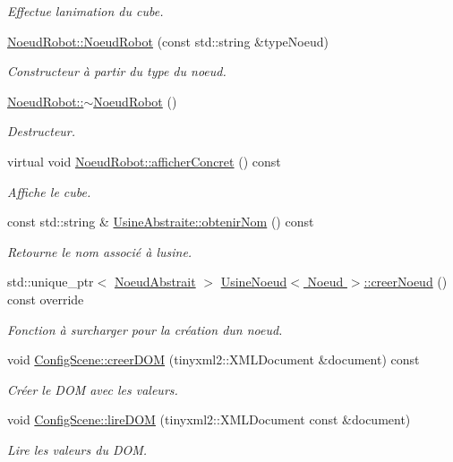\begin{DoxyCompactItemize}
\begin{DoxyCompactList}\small\item\em Effectue l\textquotesingle{}animation du cube. \end{DoxyCompactList}\item 
\hyperlink{group__inf2990_ga147453ac7f72970d7d9bfe336998ad94}{Noeud\+Robot\+::\+Noeud\+Robot} (const std\+::string \&type\+Noeud)
\begin{DoxyCompactList}\small\item\em Constructeur à partir du type du noeud. \end{DoxyCompactList}\item 
\hyperlink{group__inf2990_ga5649710d151f0548d8a7a279aad4c655}{Noeud\+Robot\+::$\sim$\+Noeud\+Robot} ()
\begin{DoxyCompactList}\small\item\em Destructeur. \end{DoxyCompactList}\item 
virtual void \hyperlink{group__inf2990_gad63a8e09cc5ca8cc349f35e0901474e2}{Noeud\+Robot\+::afficher\+Concret} () const 
\begin{DoxyCompactList}\small\item\em Affiche le cube. \end{DoxyCompactList}\item 
\hypertarget{group__inf2990_gad39877ea31a37efc3e58708193155c3c}{}const std\+::string \& \hyperlink{group__inf2990_gad39877ea31a37efc3e58708193155c3c}{Usine\+Abstraite\+::obtenir\+Nom} () const \label{group__inf2990_gad39877ea31a37efc3e58708193155c3c}

\begin{DoxyCompactList}\small\item\em Retourne le nom associé à l\textquotesingle{}usine. \end{DoxyCompactList}\item 
std\+::unique\+\_\+ptr$<$ \hyperlink{class_noeud_abstrait}{Noeud\+Abstrait} $>$ \hyperlink{group__inf2990_gaffd84653b96be43050e5dd25fff10751}{Usine\+Noeud$<$ Noeud $>$\+::creer\+Noeud} () const  override
\begin{DoxyCompactList}\small\item\em Fonction à surcharger pour la création d\textquotesingle{}un noeud. \end{DoxyCompactList}\item 
void \hyperlink{group__inf2990_ga3d0152df0c8c134ecd1a1741302db839}{Config\+Scene\+::creer\+D\+O\+M} (tinyxml2\+::\+X\+M\+L\+Document \&document) const 
\begin{DoxyCompactList}\small\item\em Créer le D\+O\+M avec les valeurs. \end{DoxyCompactList}\item 
void \hyperlink{group__inf2990_gaeacd60be947ce76a1302f6bbb40c90b1}{Config\+Scene\+::lire\+D\+O\+M} (tinyxml2\+::\+X\+M\+L\+Document const \&document)
\begin{DoxyCompactList}\small\item\em Lire les valeurs du D\+O\+M. \end{DoxyCompactList}\end{DoxyCompactItemize}
